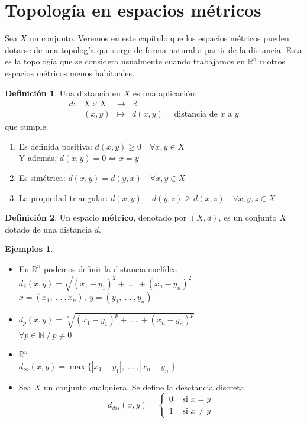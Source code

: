 \documentclass[12pt,twoside]{report}
\theoremstyle{azul}
\theoremstyle{azul2}
\theoremstyle{plain}
\theoremstyle{definition}
\newtheorem*{ejes}{Ejemplos}
\newtheorem*{defi}{Definición}
\theoremstyle{remark}
\begin{document}
\section{Topología en espacios m{\'e}tricos} \label{dist}
Sea $X$ un conjunto. Veremos en este capítulo que los espacios métricos pueden dotarse de una topología que surge de forma natural a partir de la distancia. Esta es la topología que se considera usualmente cuando trabajamos en $\mathbb{R}^n$ u otros espacios métricos menos habituales.
\begin{defi}
Una distancia en $X$ es una aplicación:
 $$\begin{array}{rcll}
     d: & X \times X & \longrightarrow & \mathbb{R} \\
     \: & (x,y) & \longmapsto & d(x,y)=\text{distancia de }x \text{ a } y
\end{array}$$
que cumple:\\
 \begin{enumerate} \vspace{-8mm}
    \item Es definida positiva: $d(x,y) \geq 0 \quad \forall x,y \in X$\\ Y además, $d(x,y) = 0 \Leftrightarrow x=y$
    \item Es sim{\'e}trica: $d(x,y)=d(y,x)\quad \forall x,y \in X$
    \item La propiedad triangular: $d(x,y)+d(y,z) \geq d(x,z) \quad \forall x,y,z \in X$
\end{enumerate}
\end{defi}
\begin{defi}
Un espacio \textbf{m{\'e}trico}, denotado por $(X,d)$, es un conjunto $X$ dotado de una distancia $d$.
\end{defi}
\begin{ejes}\:
\begin{itemize}
    \item En $\mathbb{R}^n$ podemos definir la distancia euclídea \\
    $d_2(x,y)=\sqrt{(x_1-y_1)^2+ \: \ldots \:+(x_n-y_n)^2}$\\
    $x=(x_1, \: \ldots \:, x_n), \: y=(y_1, \: \ldots \:, y_n)$
    \item $d_{p}(x,y)=\sqrt[p]{(x_1-y_1)^p+ \: \ldots \:+(x_n-y_n)^p}$ \\ $\forall p \in \mathbb{N} \: / \: p \neq 0$\\
    \item $\mathbb{R}^n$ \\
    $d_{\infty}(x,y)=\max \big\{  |x_1-y_1|  , \: \ldots \: ,  |x_n-y_n| \big\} $ \\ 
    \item Sea $X$ un conjunto cualquiera. Se define la desctancia discreta
    $$d_{dis}(x,y)=\left\{\begin{array}{ll}
         0 & \text{ si } x=y\\
         1 & \text{ si } x\neq y 
    \end{array}\right.$$
\end{itemize}
\end{ejes}
\end{document}
